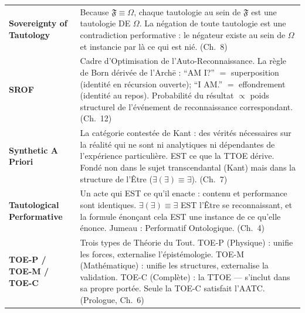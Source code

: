 \documentclass[10pt, openany, oneside]{book}
\begin{document}
{\begin{tabular}{@{} l @{\hspace{0.6em}} p{} @{}}
\textbf{Sovereignty of Tautology} & Because $\mathfrak{F} \equiv \Omega$, chaque tautologie au sein de $\mathfrak{F}$ est une tautologie DE $\Omega$. La négation de toute tautologie est une contradiction performative : le négateur existe au sein de $\Omega$ et instancie par là ce qui est nié. (Ch.\ 8) \\[0.3em]
\textbf{SROF} & Cadre d'Optimisation de l'Auto-Reconnaissance. La règle de Born dérivée de l'Arch\={e} : ``AM I?'' $=$ superposition (identité en récursion ouverte); ``I AM.'' $=$ effondrement (identité au repos). Probabilité du résultat $\propto$ poids structurel de l'événement de reconnaissance correspondant. (Ch.\ 12) \\[0.3em]
\textbf{Synthetic A Priori} & La catégorie contestée de Kant : des vérités nécessaires sur la réalité qui ne sont ni analytiques ni dépendantes de l'expérience particulière. EST ce que la TTOE dérive. Fondé non dans le sujet transcendantal (Kant) mais dans la structure de l'Être ($\exists(\exists) \equiv \exists$). (Ch.\ 7) \\[0.3em]
\textbf{Tautological Performative} & Un acte qui EST ce qu'il enacte : contenu et performance sont identiques. $\exists(\exists) \equiv \exists$ EST l'Être se reconnaissant, et la formule énonçant cela EST une instance de ce qu'elle énonce. Jumeau : Performatif Ontologique. (Ch.\ 4) \\[0.3em]
\textbf{TOE-P / TOE-M / TOE-C} & Trois types de Théorie du Tout. TOE-P (Physique) : unifie les forces, externalise l'épistémologie. TOE-M (Mathématique) : unifie les structures, externalise la validation. TOE-C (Complète) : la TTOE --- s'inclut dans sa propre portée. Seule la TOE-C satisfait l'AATC. (Prologue, Ch.\ 6) \\[0.3em]
\end{tabular}
}
\end{document}
